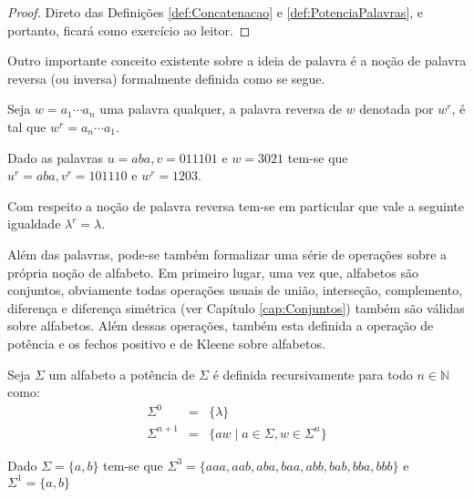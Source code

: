 \begin{proof}
	Direto das Definições \ref{def:Concatenacao} e \ref{def:PotenciaPalavras}, e portanto, ficará como exercício ao leitor.
\end{proof}

Outro importante conceito existente sobre a ideia de palavra é a noção de palavra reversa (ou inversa) formalmente definida como se segue.

\begin{definition}\label{def:PalavraInversa}
	\cite{valdi2016master} Seja $w = a_1\cdots a_n$ uma palavra qualquer, a palavra reversa de $w$ denotada por $w^r$, é tal que $w^r = a_n\cdots a_1$. 
\end{definition}

\begin{example}
	Dado as palavras $u = aba, v = 011101$ e $w = 3021$ tem-se que $u^r = aba, v^r = 101110$ e $w^r = 1203$.
\end{example}

\begin{remark}
	Com respeito a noção de palavra reversa tem-se em particular que vale a seguinte igualdade $\lambda^r = \lambda$.
\end{remark}

Além das palavras, pode-se também formalizar uma série de operações sobre a própria noção de alfabeto. Em primeiro lugar, uma vez que,  alfabetos são conjuntos, obviamente todas operações usuais de união, interseção, complemento, diferença e diferença simétrica (ver Capítulo \ref{cap:Conjuntos}) também são válidas sobre alfabetos. Além dessas operações, também esta definida a operação de potência e os fechos positivo e de Kleene sobre alfabetos.

\begin{definition}\label{def:PotenciaAlfabeto}
	\cite{benjaLivro2010} Seja $\Sigma$ um alfabeto a potência de $\Sigma$ é definida recursivamente para todo $n \in \mathbb{N}$ como:
	\begin{eqnarray}
		\Sigma^0 & = & \{\lambda\}\\
		\Sigma^{n+1} & = & \{aw \mid a \in \Sigma, w \in \Sigma^{n}\}
	\end{eqnarray}
\end{definition} 

\begin{example}
	Dado $\Sigma = \{a, b\}$ tem-se que $\Sigma^3 = \{aaa, aab, aba, baa, abb, bab, bba, bbb\}$ e $\Sigma^1 = \{a, b\}$
\end{example}


